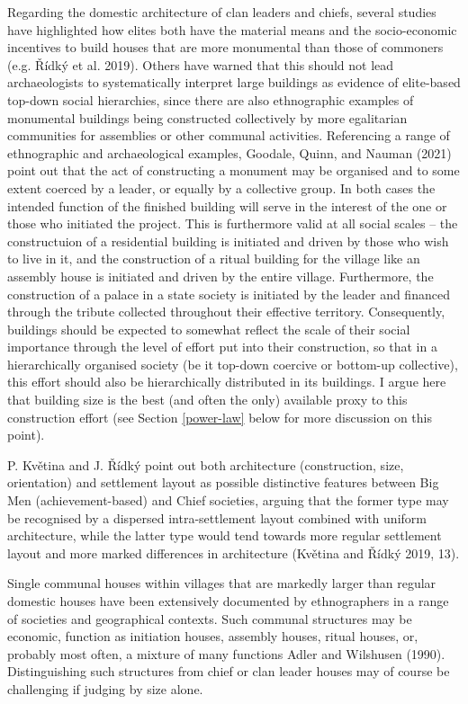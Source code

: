 \documentclass[
  12pt,
  a4paper, twoside]{book}
\begin{document}
Regarding the domestic architecture of clan leaders and chiefs, several studies have highlighted how elites both have the material means and the socio-economic incentives to build houses that are more monumental than those of commoners (e.g. Řídký et al. 2019). Others have warned that this should not lead archaeologists to systematically interpret large buildings as evidence of elite-based top-down social hierarchies, since there are also ethnographic examples of monumental buildings being constructed collectively by more egalitarian communities for assemblies or other communal activities. Referencing a range of ethnographic and archaeological examples, Goodale, Quinn, and Nauman (2021) point out that the act of constructing a monument may be organised and to some extent coerced by a leader, or equally by a collective group. In both cases the intended function of the finished building will serve in the interest of the one or those who initiated the project. This is furthermore valid at all social scales -- the constructuion of a residential building is initiated and driven by those who wish to live in it, and the construction of a ritual building for the village like an assembly house is initiated and driven by the entire village. Furthermore, the construction of a palace in a state society is initiated by the leader and financed through the tribute collected throughout their effective territory. Consequently, buildings should be expected to somewhat reflect the scale of their social importance through the level of effort put into their construction, so that in a hierarchically organised society (be it top-down coercive or bottom-up collective), this effort should also be hierarchically distributed in its buildings. I argue here that building size is the best (and often the only) available proxy to this construction effort (see Section \ref{power-law} below for more discussion on this point).

P. Květina and J. Řídký point out both architecture (construction, size, orientation) and settlement layout as possible distinctive features between Big Men (achievement-based) and Chief societies, arguing that the former type may be recognised by a dispersed intra-settlement layout combined with uniform architecture, while the latter type would tend towards more regular settlement layout and more marked differences in architecture (Květina and Řídký 2019, 13).

Single communal houses within villages that are markedly larger than regular domestic houses have been extensively documented by ethnographers in a range of societies and geographical contexts. Such communal structures may be economic, function as initiation houses, assembly houses, ritual houses, or, probably most often, a mixture of many functions Adler and Wilshusen (1990). Distinguishing such structures from chief or clan leader houses may of course be challenging if judging by size alone.
\end{document}
